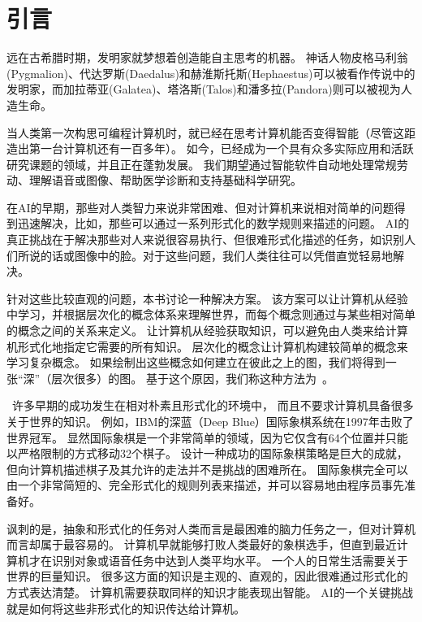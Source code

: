 \chapter{引言}
\label{chap:introduction}
远在古希腊时期，发明家就梦想着创造能自主思考的机器。
神话人物皮格马利翁(Pygmalion)、代达罗斯(Daedalus)和赫淮斯托斯(Hephaestus)可以被看作传说中的发明家，而加拉蒂亚(Galatea)、塔洛斯(Talos)和潘多拉(Pandora)则可以被视为人造生命\citep{ovid2004metamorphoses,sparkes1996red,1997works}。

当人类第一次构思可编程计算机时，就已经在思考计算机能否变得智能（尽管这距造出第一台计算机还有一百多年）\citep{Lovelace1842}。
如今，已经成为一个具有众多实际应用和活跃研究课题的领域，并且正在蓬勃发展。
我们期望通过智能软件自动地处理常规劳动、理解语音或图像、帮助医学诊断和支持基础科学研究。

在\gls{AI}的早期，那些对人类智力来说非常困难、但对计算机来说相对简单的问题得到迅速解决，比如，那些可以通过一系列形式化的数学规则来描述的问题。
\gls{AI}的真正挑战在于解决那些对人来说很容易执行、但很难形式化描述的任务，如识别人们所说的话或图像中的脸。对于这些问题，我们人类往往可以凭借直觉轻易地解决。


针对这些比较直观的问题，本书讨论一种解决方案。
该方案可以让计算机从经验中学习，并根据层次化的概念体系来理解世界，而每个概念则通过与某些相对简单的概念之间的关系来定义。
让计算机从经验获取知识，可以避免由人类来给计算机形式化地指定它需要的所有知识。
层次化的概念让计算机构建较简单的概念来学习复杂概念。
如果绘制出这些概念如何建立在彼此之上的图，我们将得到一张``深''（层次很多）的图。
基于这个原因，我们称这种方法为~。


~许多早期的成功发生在相对朴素且形式化的环境中， 而且不要求计算机具备很多关于世界的知识。
例如，IBM的深蓝（Deep Blue）国际象棋系统在1997年击败了世界冠军\citep{Hsu2002}。
显然国际象棋是一个非常简单的领域，因为它仅含有64个位置并只能以严格限制的方式移动32个棋子。
设计一种成功的国际象棋策略是巨大的成就，但向计算机描述棋子及其允许的走法并不是挑战的困难所在。
国际象棋完全可以由一个非常简短的、完全形式化的规则列表来描述，并可以容易地由程序员事先准备好。

讽刺的是，抽象和形式化的任务对人类而言是最困难的脑力任务之一，但对计算机而言却属于最容易的。
计算机早就能够打败人类最好的象棋选手，但直到最近计算机才在识别对象或语音任务中达到人类平均水平。
一个人的日常生活需要关于世界的巨量知识。
很多这方面的知识是主观的、直观的，因此很难通过形式化的方式表达清楚。
计算机需要获取同样的知识才能表现出智能。
\gls{AI}的一个关键挑战就是如何将这些非形式化的知识传达给计算机。

